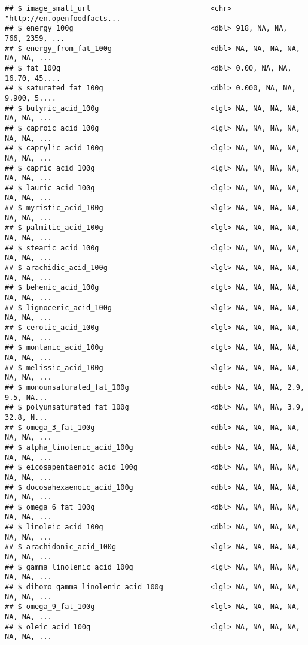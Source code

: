\documentclass[]{article}
\begin{document}
\begin{verbatim}
## $ image_small_url                            <chr> "http://en.openfoodfacts...
## $ energy_100g                                <dbl> 918, NA, NA, 766, 2359, ...
## $ energy_from_fat_100g                       <dbl> NA, NA, NA, NA, NA, NA, ...
## $ fat_100g                                   <dbl> 0.00, NA, NA, 16.70, 45....
## $ saturated_fat_100g                         <dbl> 0.000, NA, NA, 9.900, 5....
## $ butyric_acid_100g                          <lgl> NA, NA, NA, NA, NA, NA, ...
## $ caproic_acid_100g                          <lgl> NA, NA, NA, NA, NA, NA, ...
## $ caprylic_acid_100g                         <lgl> NA, NA, NA, NA, NA, NA, ...
## $ capric_acid_100g                           <lgl> NA, NA, NA, NA, NA, NA, ...
## $ lauric_acid_100g                           <lgl> NA, NA, NA, NA, NA, NA, ...
## $ myristic_acid_100g                         <lgl> NA, NA, NA, NA, NA, NA, ...
## $ palmitic_acid_100g                         <lgl> NA, NA, NA, NA, NA, NA, ...
## $ stearic_acid_100g                          <lgl> NA, NA, NA, NA, NA, NA, ...
## $ arachidic_acid_100g                        <lgl> NA, NA, NA, NA, NA, NA, ...
## $ behenic_acid_100g                          <lgl> NA, NA, NA, NA, NA, NA, ...
## $ lignoceric_acid_100g                       <lgl> NA, NA, NA, NA, NA, NA, ...
## $ cerotic_acid_100g                          <lgl> NA, NA, NA, NA, NA, NA, ...
## $ montanic_acid_100g                         <lgl> NA, NA, NA, NA, NA, NA, ...
## $ melissic_acid_100g                         <lgl> NA, NA, NA, NA, NA, NA, ...
## $ monounsaturated_fat_100g                   <dbl> NA, NA, NA, 2.9, 9.5, NA...
## $ polyunsaturated_fat_100g                   <dbl> NA, NA, NA, 3.9, 32.8, N...
## $ omega_3_fat_100g                           <dbl> NA, NA, NA, NA, NA, NA, ...
## $ alpha_linolenic_acid_100g                  <dbl> NA, NA, NA, NA, NA, NA, ...
## $ eicosapentaenoic_acid_100g                 <dbl> NA, NA, NA, NA, NA, NA, ...
## $ docosahexaenoic_acid_100g                  <dbl> NA, NA, NA, NA, NA, NA, ...
## $ omega_6_fat_100g                           <dbl> NA, NA, NA, NA, NA, NA, ...
## $ linoleic_acid_100g                         <dbl> NA, NA, NA, NA, NA, NA, ...
## $ arachidonic_acid_100g                      <lgl> NA, NA, NA, NA, NA, NA, ...
## $ gamma_linolenic_acid_100g                  <lgl> NA, NA, NA, NA, NA, NA, ...
## $ dihomo_gamma_linolenic_acid_100g           <lgl> NA, NA, NA, NA, NA, NA, ...
## $ omega_9_fat_100g                           <lgl> NA, NA, NA, NA, NA, NA, ...
## $ oleic_acid_100g                            <lgl> NA, NA, NA, NA, NA, NA, ...

\end{verbatim}
\end{document}
